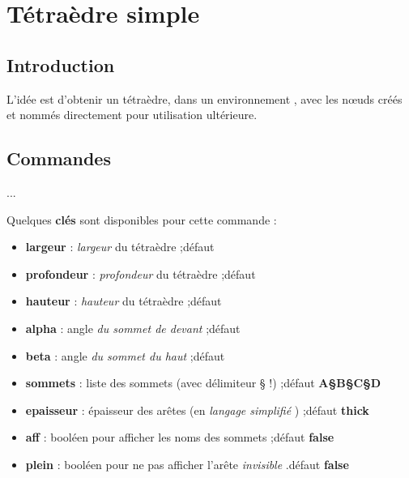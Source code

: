 \documentclass{article}
\newcommand\Cle[1]{{\bfseries\sffamily\textlangle #1\textrangle}}
\begin{document}
\newpage

\section{Tétraèdre \og simple \fg{}}

\subsection{Introduction}

\begin{codeidee}
L'idée est d'obtenir un tétraèdre, dans un environnement \TikZ, avec les nœuds créés et nommés directement pour utilisation ultérieure.
\end{codeidee}

\subsection{Commandes}

\begin{codetex}
...
\end{codetex}

\begin{codecles}
Quelques \Cle{clés} sont disponibles pour cette commande :

\begin{itemize}
	\item \Cle{largeur} : \textit{largeur} du tétraèdre ;\hfill{}défaut \Cle{4}
	\item \Cle{profondeur} : \textit{profondeur} du tétraèdre ;\hfill{}défaut \Cle{1.25}
	\item \Cle{hauteur} : \textit{hauteur} du tétraèdre ;\hfill{}défaut \Cle{3}
	\item \Cle{alpha} : angle \textit{du sommet de devant} ;\hfill{}défaut \Cle{40}
	\item \Cle{beta} : angle \textit{du sommet du haut} ;\hfill{}défaut \Cle{60}
	\item \Cle{sommets} : liste des sommets (avec délimiteur § !) ;\hfill{}défaut \Cle{A§B§C§D}
	\item \Cle{epaisseur} : épaisseur des arêtes (en \textit{langage simplifié} \TikZ) ;\hfill{}défaut \Cle{thick}
	\item \Cle{aff} : booléen pour afficher les noms des sommets ;\hfill{}défaut \Cle{false}
	\item \Cle{plein} : booléen pour ne pas afficher l'arête \textit{invisible} .\hfill{}défaut \Cle{false}
\end{itemize}
\end{codecles}
\end{document}
